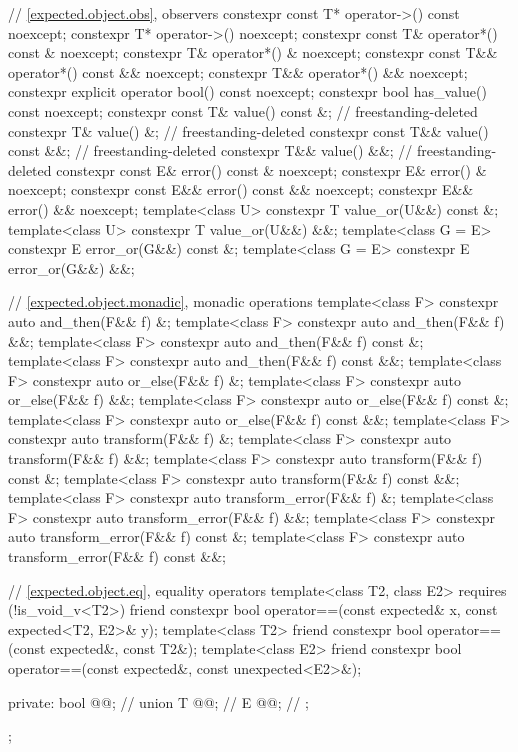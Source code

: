 \begin{codeblock}
{{    // \ref{expected.object.obs}, observers
    constexpr const T* operator->() const noexcept;
    constexpr T* operator->() noexcept;
    constexpr const T& operator*() const & noexcept;
    constexpr T& operator*() & noexcept;
    constexpr const T&& operator*() const && noexcept;
    constexpr T&& operator*() && noexcept;
    constexpr explicit operator bool() const noexcept;
    constexpr bool has_value() const noexcept;
    constexpr const T& value() const &;                                     // freestanding-deleted
    constexpr T& value() &;                                                 // freestanding-deleted
    constexpr const T&& value() const &&;                                   // freestanding-deleted
    constexpr T&& value() &&;                                               // freestanding-deleted
    constexpr const E& error() const & noexcept;
    constexpr E& error() & noexcept;
    constexpr const E&& error() const && noexcept;
    constexpr E&& error() && noexcept;
    template<class U> constexpr T value_or(U&&) const &;
    template<class U> constexpr T value_or(U&&) &&;
    template<class G = E> constexpr E error_or(G&&) const &;
    template<class G = E> constexpr E error_or(G&&) &&;

    // \ref{expected.object.monadic}, monadic operations
    template<class F> constexpr auto and_then(F&& f) &;
    template<class F> constexpr auto and_then(F&& f) &&;
    template<class F> constexpr auto and_then(F&& f) const &;
    template<class F> constexpr auto and_then(F&& f) const &&;
    template<class F> constexpr auto or_else(F&& f) &;
    template<class F> constexpr auto or_else(F&& f) &&;
    template<class F> constexpr auto or_else(F&& f) const &;
    template<class F> constexpr auto or_else(F&& f) const &&;
    template<class F> constexpr auto transform(F&& f) &;
    template<class F> constexpr auto transform(F&& f) &&;
    template<class F> constexpr auto transform(F&& f) const &;
    template<class F> constexpr auto transform(F&& f) const &&;
    template<class F> constexpr auto transform_error(F&& f) &;
    template<class F> constexpr auto transform_error(F&& f) &&;
    template<class F> constexpr auto transform_error(F&& f) const &;
    template<class F> constexpr auto transform_error(F&& f) const &&;

    // \ref{expected.object.eq}, equality operators
    template<class T2, class E2> requires (!is_void_v<T2>)
      friend constexpr bool operator==(const expected& x, const expected<T2, E2>& y);
    template<class T2>
      friend constexpr bool operator==(const expected&, const T2&);
    template<class E2>
      friend constexpr bool operator==(const expected&, const unexpected<E2>&);

  private:
    bool @@;       // \expos
    union {
      T @@;            // \expos
      E @@;           // \expos
    };
  };
}
\end{codeblock}

